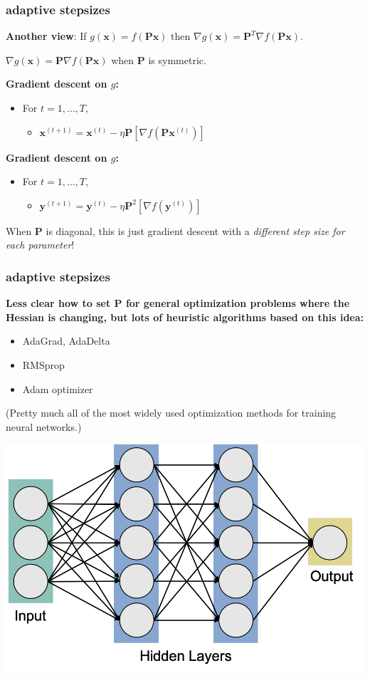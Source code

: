 \documentclass[compress]{beamer}
\newcommand{\bv}[1]{\mathbf{#1}}
\begin{document}
\begin{frame}
	\frametitle{adaptive stepsizes}
	\textbf{Another view}: If $g(\bv{x}) = f(\bv{P}\bv{x})$ then $\nabla g(\bv{x}) = \bv{P}^T\nabla f(\bv{P}\bv{x})$.
	
	$\nabla g(\bv{x})  = \bv{P}\nabla f(\bv{P}\bv{x})$ when $\bv{P}$ is symmetric. 
	
	\vspace{1em}
	\textbf{Gradient descent on $g$:}
	\begin{itemize}
		\item For $t = 1,\ldots, T$,
		\begin{itemize}
			\item $\bv{x}^{(t+1)} = \bv{x}^{(t)} - \eta\bv{P}\left[\nabla f(\bv{P}\bv{x}^{(t)})\right]$
		\end{itemize}
	\end{itemize}
	
	\vspace{1em}
	\textbf{Gradient descent on $g$:}
	\begin{itemize}
		\item For $t = 1,\ldots, T$,
		\begin{itemize}
			\item $\bv{y}^{(t+1)} = \bv{y}^{(t)} - \eta\bv{P}^2\left[\nabla f(\bv{y}^{(t)})\right]$
		\end{itemize}
	\end{itemize}
	\begin{center}
		\alert{When $\bv{P}$ is diagonal, this is just gradient descent with a \emph{different step size for each parameter}!}
	\end{center}
\end{frame}

\begin{frame}
	\frametitle{adaptive stepsizes}
	\textbf{Less clear how to set $\bv{P}$ for general optimization problems where the Hessian is changing, but lots of heuristic algorithms based on this idea:}
	\begin{itemize}
		\item AdaGrad, AdaDelta
		\item RMSprop
		\item Adam optimizer
	\end{itemize}
	\begin{center}
		\vspace{-.5em}
		\alert{(Pretty much all of the most widely used optimization methods for training neural networks.)}
		
		\includegraphics[width=.4\textwidth]{neuralNetwork.png}
	\end{center}
\end{frame}
\end{document}
